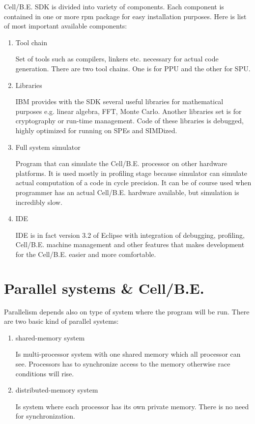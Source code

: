 \mbox{Cell/B.E.} SDK is divided into variety of components.
Each component is contained in one or more rpm package for easy installation purposes.
Here is list of most important available components:
\begin{enumerate}
  \item {Tool chain}
  \par
  Set of tools such as compilers, linkers etc. necessary for actual code generation.
There are two tool chains.
One is for PPU and the other for SPU.

  \item {Libraries}
  \par
  IBM provides with the SDK several useful libraries for mathematical purposes e.g. linear algebra, FFT, Monte Carlo.
Another libraries set is for cryptography or run-time management.
Code of these libraries is debugged, highly optimized for running on SPEs and SIMDized.

  \item {Full system simulator}
  \par
  Program that can simulate the \mbox{Cell/B.E.} processor on other hardware platforms.
It is used mostly in profiling stage because simulator can simulate actual computation of a code in cycle precision.
It can be of course used when programmer has an actual \mbox{Cell/B.E.} hardware available, but simulation is incredibly slow.

  \item {IDE}
  \par
  IDE is in fact version 3.2 of Eclipse with integration of debugging, profiling, \mbox{Cell/B.E.} machine management and other features that makes development for the \mbox{Cell/B.E.} easier and more comfortable.
\end{enumerate}


\section{Parallel systems \& \mbox{Cell/B.E.}}

Parallelism depends also on type of system where the program will be run.
There are two basic kind of parallel systems:
\begin{enumerate}
\item {shared-memory system}
\par
Is multi-processor system with one shared memory which all processor can see.
Processors has to synchronize access to the memory otherwise race conditions will rise.

\item {distributed-memory system}
\par
Is system where each processor has its own private memory.
There is no need for synchronization.
\end{enumerate}

